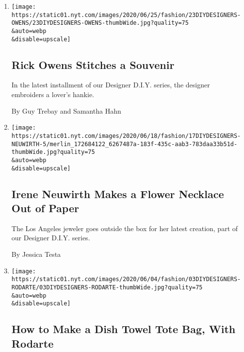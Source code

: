 \begin{enumerate}
\def\labelenumi{\arabic{enumi}.}
\item
  \href{/2020/06/23/style/DIY-sewing-rick-owens-stitches-a-souvenir.html}{}

  \texttt{[image: https://static01.nyt.com/images/2020/06/25/fashion/23DIYDESIGNERS-OWENS/23DIYDESIGNERS-OWENS-thumbWide.jpg?quality=75\\\&auto=webp\\\&disable=upscale]}

  \hypertarget{rick-owens-stitches-a-souvenir}{%
  \subsection{Rick Owens Stitches a
  Souvenir}\label{rick-owens-stitches-a-souvenir}}

  In the latest installment of our Designer D.I.Y. series, the designer
  embroiders a lover's hankie.

  By Guy Trebay and Samantha Hahn
\item
  \href{/2020/06/17/style/paper-flower-necklace-DIY.html}{}

  \texttt{[image: https://static01.nyt.com/images/2020/06/18/fashion/17DIYDESIGNERS-NEUWIRTH-5/merlin\_172684122\_6267487a-183f-435c-aab3-783daa33b51d-thumbWide.jpg?quality=75\\\&auto=webp\\\&disable=upscale]}

  \hypertarget{irene-neuwirth-makes-a-flower-necklace-out-of-paper}{%
  \subsection{Irene Neuwirth Makes a Flower Necklace Out of
  Paper}\label{irene-neuwirth-makes-a-flower-necklace-out-of-paper}}

  The Los Angeles jeweler goes outside the box for her latest creation,
  part of our Designer D.I.Y. series.

  By Jessica Testa
\item
  \href{/2020/06/02/style/dish-towel-tote-bag.html}{}

  \texttt{[image: https://static01.nyt.com/images/2020/06/04/fashion/03DIYDESIGNERS-RODARTE/03DIYDESIGNERS-RODARTE-thumbWide.jpg?quality=75\\\&auto=webp\\\&disable=upscale]}

  \hypertarget{how-to-make-a-dish-towel-tote-bag-with-rodarte}{%
  \subsection{How to Make a Dish Towel Tote Bag, With
  Rodarte}\label{how-to-make-a-dish-towel-tote-bag-with-rodarte}}


\end{enumerate}
